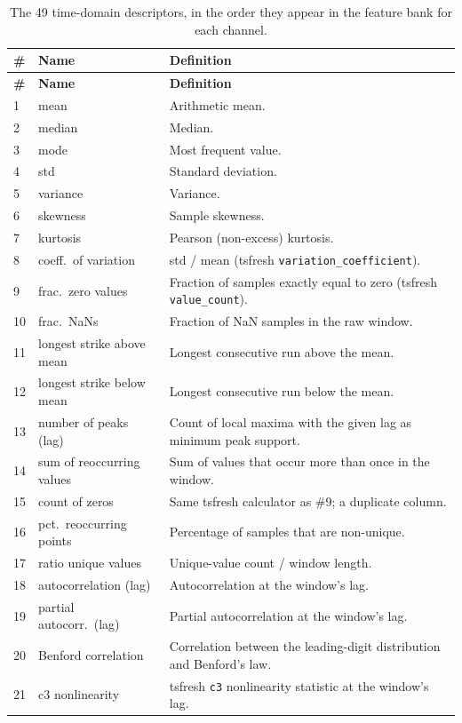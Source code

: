 \documentclass[11pt,a4paper]{article}
\begin{document}
\begin{longtable}{@{}p{0.5cm}p{5.8cm}p{7.8cm}@{}}
\caption{The 49 time-domain descriptors, in the order they appear in the
feature bank for each channel.}
\label{tab:tddefs}\\
\toprule
\textbf{\#} & \textbf{Name} & \textbf{Definition} \\
\midrule
\endfirsthead
\toprule
\textbf{\#} & \textbf{Name} & \textbf{Definition} \\
\midrule
\endhead
1 & mean & Arithmetic mean. \\
2 & median & Median. \\
3 & mode & Most frequent value. \\
4 & std & Standard deviation. \\
5 & variance & Variance. \\
6 & skewness & Sample skewness. \\
7 & kurtosis & Pearson (non-excess) kurtosis. \\
8 & coeff.\ of variation & std / mean (tsfresh \texttt{variation\_coefficient}). \\
9 & frac.\ zero values & Fraction of samples exactly equal to zero (tsfresh \texttt{value\_count}). \\
10 & frac.\ NaNs & Fraction of NaN samples in the raw window. \\
11 & longest strike above mean & Longest consecutive run above the mean. \\
12 & longest strike below mean & Longest consecutive run below the mean. \\
13 & number of peaks (lag) & Count of local maxima with the given lag as minimum peak support. \\
14 & sum of reoccurring values & Sum of values that occur more than once in the window. \\
15 & count of zeros & Same tsfresh calculator as \#9; a duplicate column. \\
16 & pct.\ reoccurring points & Percentage of samples that are non-unique. \\
17 & ratio unique values & Unique-value count / window length. \\
18 & autocorrelation (lag) & Autocorrelation at the window's lag. \\
19 & partial autocorr.\ (lag) & Partial autocorrelation at the window's lag. \\
20 & Benford correlation & Correlation between the leading-digit distribution and Benford's law. \\
21 & c3 nonlinearity & tsfresh \texttt{c3} nonlinearity statistic at the window's lag. \\

\end{longtable}
\end{document}
